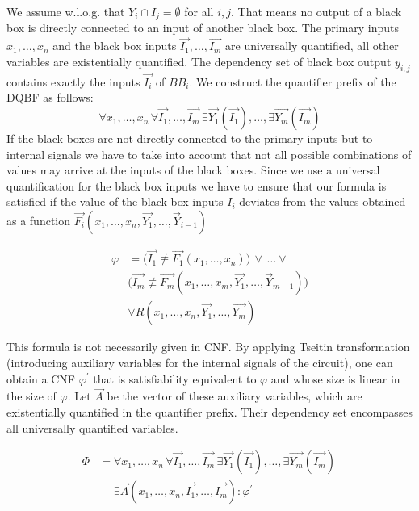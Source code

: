 \documentclass[runningheads]{llncs}
\begin{document}
We assume w.l.o.g. that $Y_i \cap I_j = \emptyset$  for all $i,j$. That means no output of a black box is directly connected to an input of another black box.
The primary inputs $x_1 ,\dots, x_n$ and the black box inputs $\overrightarrow{I_1},\dots,\overrightarrow{I_m}$ are universally quantified, all other variables are existentially
quantified.
The dependency set of black box output $y_{i,j}$ contains exactly the inputs $\overrightarrow{I_i}$ of $BB_i$.
We construct the quantifier prefix of the DQBF as follows:
\[
\forall x_1,\dots,x_n \, \forall \overrightarrow{I_1},\dots,\overrightarrow{I_m} \, \exists \overrightarrow{Y_1}(\overrightarrow{I_1}),\dots, \exists \overrightarrow{Y_m}(\overrightarrow{I_m})
\]
If the black boxes are not directly connected to the primary inputs but to internal signals we have to take into account that not all possible combinations of values may arrive at the inputs of the black boxes.
Since we use a universal quantification for the black box inputs we have to ensure that our formula is satisfied if the value of the black box inputs $I_i$ deviates from the values
obtained as a function $\overrightarrow{F_i} (x_1 ,\dots, x_n,\overrightarrow{Y_1} ,\dots ,\overrightarrow{Y}_{i-1} )$

\begin{equation}
\begin{split}\nonumber
	 \varphi &=  \big( \overrightarrow{I_1} \not\equiv \overrightarrow{F_1} (x_1 ,\dots, x_n)  \big) \, \lor \, \dots \lor  \\
	 & \big( \overrightarrow{I_m} \not\equiv \overrightarrow{F_m} (x_1 ,\dots,x_m, \overrightarrow{Y_1} ,\dots,\overrightarrow{Y}_{m-1})  \big) \\
	 & \lor R(x_1,\dots, x_n, \overrightarrow{Y_1},\dots,\overrightarrow{Y_m})
\end{split}
\end{equation}

This formula is not necessarily given in CNF. By applying Tseitin transformation (introducing auxiliary variables for the internal signals of the circuit), one can obtain a
CNF $\varphi^{\prime}$ that is satisfiability equivalent to $\varphi$ and whose size is linear in the size of $\varphi$.
Let $\overrightarrow{A}$ be the vector of these auxiliary variables, which are existentially quantified in the quantifier prefix.
Their dependency set encompasses all universally quantified variables.

\begin{equation}
\begin{split}\nonumber
\Phi &= 	\forall x_1,\dots,x_n \, \forall \overrightarrow{I_1},\dots,\overrightarrow{I_m} \, \exists \overrightarrow{Y_1}(\overrightarrow{I_1}),\dots, \exists \overrightarrow{Y_m}(\overrightarrow{I_m}) \, \\
& \,\,\,\,\,\,\,\, \exists \overrightarrow{A}(x_1,\dots,x_n, \overrightarrow{I_1},\dots,\overrightarrow{I_m}): \varphi^{\prime}
\end{split}
\end{equation}
\end{document}
